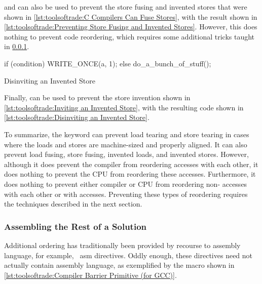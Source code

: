  and  can also be used to prevent the
store fusing and invented stores that were shown in
\cref{lst:toolsoftrade:C Compilers Can Fuse Stores},
with the result shown in
\cref{lst:toolsoftrade:Preventing Store Fusing and Invented Stores}.
However, this does nothing to prevent code reordering, which requires
some additional tricks taught in
\cref{sec:toolsoftrade:Assembling the Rest of a Solution}.

\begin{listing}
\begin{fcvlabel}
\begin{VerbatimL}[commandchars=\\\{\}]
if (condition)
	WRITE_ONCE(a, 1);
else
	do_a_bunch_of_stuff();
\end{VerbatimL}
\end{fcvlabel}
\caption{Disinviting an Invented Store}
\label{lst:toolsoftrade:Disinviting an Invented Store}
\end{listing}

Finally,  can be used to prevent the store invention
shown in
\cref{lst:toolsoftrade:Inviting an Invented Store},
with the resulting code shown in
\cref{lst:toolsoftrade:Disinviting an Invented Store}.

To summarize, the  keyword can prevent load
tearing and store tearing in cases where the loads and stores are
machine-sized and properly aligned.
It can also prevent load fusing, store fusing, invented loads, and
invented stores.
However, although it does prevent the compiler from reordering 
accesses with each other, it does nothing to prevent the
CPU from reordering these accesses.
Furthermore, it does nothing to prevent either compiler or CPU from
reordering non- accesses with each other or with
 accesses.
Preventing these types of reordering requires the techniques described
in the next section.

\subsubsection{Assembling the Rest of a Solution}
\label{sec:toolsoftrade:Assembling the Rest of a Solution}

Additional ordering has traditionally been provided by recourse to
assembly language, for example, \GCC\ asm directives.
Oddly enough, these directives need not actually contain assembly language,
as exemplified by the  macro shown in
\cref{lst:toolsoftrade:Compiler Barrier Primitive (for GCC)}.

